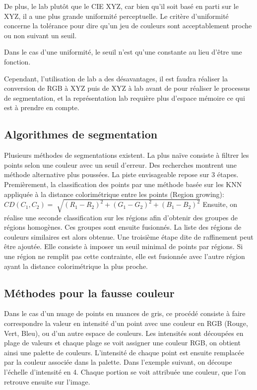 \documentclass[12pt,titlepage,french]{article}
\begin{document}
De plus, le lab plutôt que le CIE XYZ, car bien qu'il soit basé en parti sur le XYZ, il a une plus grande uniformité perceptuelle. Le critère d'uniformité concerne la tolérance pour dire qu'un jeu de couleurs sont acceptablement proche ou non suivant un seuil.

Dans le cas d'une uniformité, le seuil n'est qu'une constante au lieu d'être une fonction.

Cependant, l'utilisation de lab a des désavantages, il est faudra réaliser la conversion de RGB à XYZ puis de XYZ à lab avant de pour réaliser le processus de segmentation, et la représentation lab requière plus d'espace mémoire ce qui est à prendre en compte.

\subsection{Algorithmes de segmentation}
Plusieurs méthodes de segmentations existent. La plus naïve consiste à filtrer les points selon une couleur avec un seuil d'erreur.
Des recherches montrent une méthode alternative plus poussées.
La piste envisageable repose sur 3 étapes.
Premièrement, la classification des points par une méthode basée sur les KNN appliquée à la distance colorimétrique entre les points (Region growing):
$
CD(C_1,C_2)=\sqrt[]{(R_1-R_2)^2 + (G_1-G_2)^2 + (B_1-B_2)^2}
$
Ensuite, on réalise une seconde classification sur les régions afin d'obtenir des groupes de régions homogènes.
Ces groupes sont ensuite fusionnés. La liste des régions de couleurs similaires est alors obtenue.
Une troisième étape dite de raffinement peut être ajoutée. Elle consiste à imposer un seuil minimal de points par régions.
Si une région ne remplit pas cette contrainte, elle est fusionnée avec l'autre région ayant la distance colorimétrique la plus proche.

\subsection{Méthodes pour la fausse couleur}
Dans le cas d'un nuage de points en nuances de gris, ce procédé consiste à faire correspondre la valeur en intensité d'un point avec une couleur en RGB (Rouge, Vert, Bleu), ou d'un autre espace de couleurs.
Les intensités sont découpées en plage de valeurs et chaque plage se voit assigner une couleur RGB, on obtient ainsi une palette de couleurs. L'intensité de chaque point est ensuite remplacée par la couleur associée dans la palette.
Dans l'exemple suivant, on découpe l'échelle d'intensité en 4. Chaque portion se voit attribuée une couleur, que l'on retrouve ensuite sur l'image.
\end{document}
